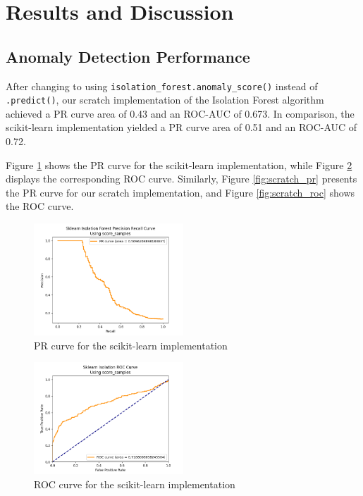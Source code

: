 
\section{Results and Discussion}
\subsection{Anomaly Detection Performance}
After changing to using \texttt{isolation\_forest.anomaly\_score()} instead of \texttt{.predict()}, our scratch implementation of the Isolation Forest algorithm achieved a PR curve area of 0.43 and an ROC-AUC of 0.673. In comparison, the scikit-learn implementation yielded a PR curve area of 0.51 and an ROC-AUC of 0.72.

Figure \ref{fig:sklearn_pr} shows the PR curve for the scikit-learn implementation, while Figure \ref{fig:sklearn_roc} displays the corresponding ROC curve. Similarly, Figure \ref{fig:scratch_pr} presents the PR curve for our scratch implementation, and Figure \ref{fig:scratch_roc} shows the ROC curve.

\begin{figure}[htbp]
\centering
\includegraphics[width=0.5\textwidth]{resources/images/_sklearn_isolation_forest_pr_curve.png}
\caption{PR curve for the scikit-learn implementation}
\label{fig:sklearn_pr}
\end{figure}

\begin{figure}[htbp]
\centering
\includegraphics[width=0.5\textwidth]{resources/images/_sklearn_isolation_forest_roc_curve.png}
\caption{ROC curve for the scikit-learn implementation}
\label{fig:sklearn_roc}
\end{figure}

